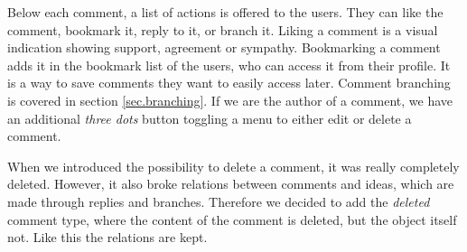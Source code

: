 \documentclass[a4paper,12pt,twoside]{article}
\begin{document}
Below each comment, a list of actions is offered to the users.
They can like the comment, bookmark it, reply to it, or branch it.
Liking a comment is a visual indication showing support, agreement or sympathy.
Bookmarking a comment adds it in the bookmark list of the users, who can access it from their profile.
It is a way to save comments they want to easily access later.
Comment branching is covered in section \ref{sec.branching}.
If we are the author of a comment, we have an additional \emph{three dots} button toggling a menu to either edit or delete a comment.

When we introduced the possibility to delete a comment, it was really completely deleted.
However, it also broke relations between comments and ideas, which are made through replies and branches.
Therefore we decided to add the \emph{deleted} comment type, where the content of the comment is deleted, but the object itself not.
Like this the relations are kept.
\end{document}
